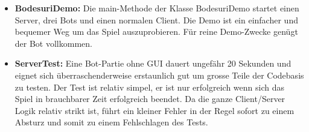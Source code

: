 \documentclass[12pt,halfparskip]{scrartcl}
\begin{document}
\begin{itemize}
	\item \textbf{BodesuriDemo:} Die main-Methode der Klasse BodesuriDemo startet einen Server, drei Bots und einen normalen Client. Die Demo ist ein einfacher und bequemer Weg um das Spiel auszuprobieren. Für reine Demo-Zwecke genügt der Bot vollkommen.
	\item \textbf{ServerTest:} Eine Bot-Partie ohne GUI dauert ungefähr 20 Sekunden und eignet sich überraschenderweise erstaunlich gut um grosse Teile der Codebasis zu testen. Der Test ist relativ simpel, er ist nur erfolgreich wenn sich das Spiel in brauchbarer Zeit erfolgreich beendet. Da die ganze Client/Server Logik relativ strikt ist, führt ein kleiner Fehler in der Regel sofort zu einem Absturz und somit zu einem Fehlschlagen des Tests.
\end{itemize}

\clearpage
\listoffigures
\end{document}
